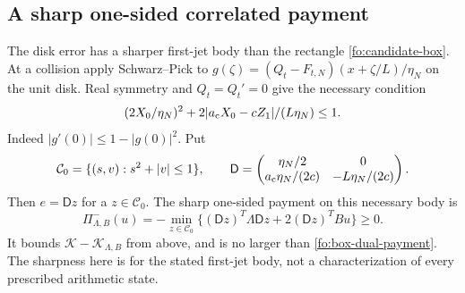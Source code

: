 \documentclass[11pt]{article}
\numberwithin{equation}{section}
\theoremstyle{definition}
\theoremstyle{remark}
\begin{document}
\subsection{A sharp one-sided correlated payment}
\label{fo:curved-payment}
The disk error has a sharper first-jet body than the rectangle
\eqref{fo:candidate-box}.  At a collision apply Schwarz--Pick to
$g(\zeta)=(Q_t-F_{t,N})(x+\zeta/L)/\eta_N$ on the unit disk.
Real symmetry and $Q_t=Q_t'=0$ give the necessary condition
\begin{equation}
(2X_0/\eta_N)^2+2|a_{\rm c}X_0-cZ_1|/(L\eta_N)\le1.
\label{fo:curved-body}
\end{equation}
Indeed $|g'(0)|\le1-|g(0)|^2$.  Put
\begin{equation}
\mathcal C_0=\{(s,v):s^2+|v|\le1\},\qquad
\mathsf D=\begin{pmatrix}\eta_N/2&0\\
 a_{\rm c}\eta_N/(2c)&-L\eta_N/(2c)\end{pmatrix}.
\end{equation}
Then $e=\mathsf Dz$ for a $z\in\mathcal C_0$.  The sharp one-sided
payment on this necessary body is
\begin{equation}
\Pi^-_{\Lambda,B}(u)=
 -\min_{z\in\mathcal C_0}\{(\mathsf Dz)^T\Lambda\mathsf Dz
                            +2(\mathsf Dz)^TBu\}\ge0.
\label{fo:onesided}
\end{equation}
It bounds $\mathcal K-\mathcal K_{\Lambda,B}$ from above, and is
no larger than \eqref{fo:box-dual-payment}.  The sharpness here is
for the stated first-jet body, not a characterization of every
prescribed arithmetic state.
\end{document}
